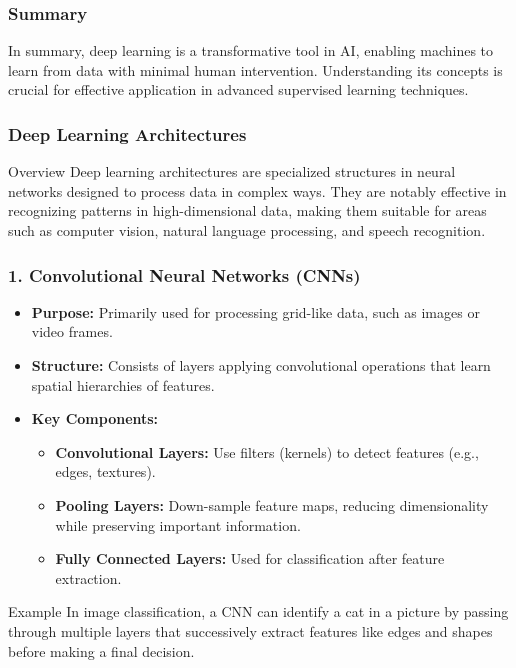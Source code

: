 \documentclass[aspectratio=169]{beamer}
\begin{document}
\begin{frame}
  \frametitle{Summary}
  In summary, deep learning is a transformative tool in AI, enabling machines to learn from data with minimal human intervention. Understanding its concepts is crucial for effective application in advanced supervised learning techniques.
\end{frame}

\begin{frame}
    \frametitle{Deep Learning Architectures}
    \begin{block}{Overview}
        Deep learning architectures are specialized structures in neural networks designed to process data in complex ways. They are notably effective in recognizing patterns in high-dimensional data, making them suitable for areas such as computer vision, natural language processing, and speech recognition.
    \end{block}
\end{frame}

\begin{frame}
    \frametitle{1. Convolutional Neural Networks (CNNs)}
    \begin{itemize}
        \item \textbf{Purpose:} Primarily used for processing grid-like data, such as images or video frames.
        \item \textbf{Structure:} Consists of layers applying convolutional operations that learn spatial hierarchies of features.
        \item \textbf{Key Components:}
            \begin{itemize}
                \item \textbf{Convolutional Layers:} Use filters (kernels) to detect features (e.g., edges, textures).
                \item \textbf{Pooling Layers:} Down-sample feature maps, reducing dimensionality while preserving important information.
                \item \textbf{Fully Connected Layers:} Used for classification after feature extraction.
            \end{itemize}
    \end{itemize}
    \begin{block}{Example}
        In image classification, a CNN can identify a cat in a picture by passing through multiple layers that successively extract features like edges and shapes before making a final decision.
    \end{block}
\end{frame}
\end{document}
